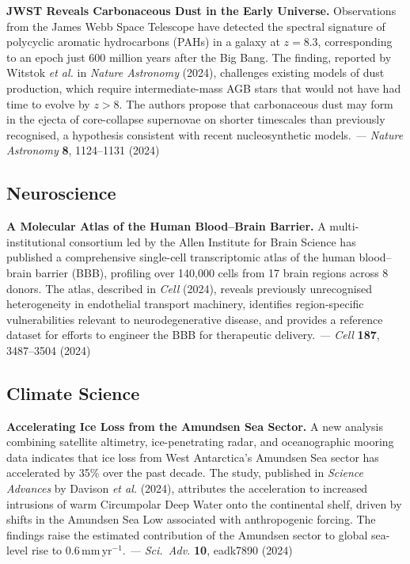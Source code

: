 \documentclass[a4paper,11pt]{article}
\begin{document}
{\sffamily\bfseries\color{accent}JWST Reveals Carbonaceous Dust in the Early
Universe.} Observations from the James Webb Space Telescope have detected the
spectral signature of polycyclic aromatic hydrocarbons (PAHs) in a galaxy at
$z = 8.3$, corresponding to an epoch just 600 million years after the Big Bang.
The finding, reported by Witstok \textit{et al.} in \textit{Nature Astronomy}
(2024), challenges existing models of dust production, which require
intermediate-mass AGB stars that would not have had time to evolve by $z > 8$.
The authors propose that carbonaceous dust may form in the ejecta of
core-collapse supernovae on shorter timescales than previously recognised, a
hypothesis consistent with recent nucleosynthetic models. \textit{--- Nature
Astronomy} {\bf 8}, 1124--1131 (2024)

\subsection*{Neuroscience}

{\sffamily\bfseries\color{accent}A Molecular Atlas of the Human Blood--Brain
Barrier.} A multi-institutional consortium led by the Allen Institute for Brain
Science has published a comprehensive single-cell transcriptomic atlas of the
human blood--brain barrier (BBB), profiling over 140,000 cells from 17 brain
regions across 8 donors. The atlas, described in \textit{Cell} (2024), reveals
previously unrecognised heterogeneity in endothelial transport machinery,
identifies region-specific vulnerabilities relevant to neurodegenerative
disease, and provides a reference dataset for efforts to engineer the BBB for
therapeutic delivery. \textit{--- Cell} {\bf 187}, 3487--3504 (2024)

\subsection*{Climate Science}

{\sffamily\bfseries\color{accent}Accelerating Ice Loss from the Amundsen Sea
Sector.} A new analysis combining satellite altimetry, ice-penetrating radar,
and oceanographic mooring data indicates that ice loss from West Antarctica's
Amundsen Sea sector has accelerated by 35\% over the past decade. The study,
published in \textit{Science Advances} by Davison \textit{et al.} (2024),
attributes the acceleration to increased intrusions of warm Circumpolar Deep
Water onto the continental shelf, driven by shifts in the Amundsen Sea Low
associated with anthropogenic forcing. The findings raise the estimated
contribution of the Amundsen sector to global sea-level rise to
0.6\,mm\,yr$^{-1}$. \textit{--- Sci.\ Adv.} {\bf 10}, eadk7890 (2024)
\end{document}
